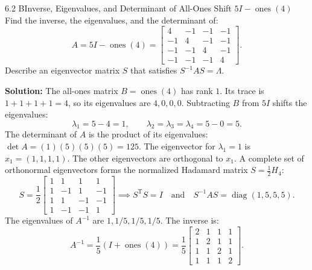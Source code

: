\documentclass[11pt,a4paper,openany,oneside]{book}
\def\vect#1{#1}%
\def\mathbf#1{#1}%
\newcommand{\vect}[1]{\mathbf{#1}}
\newcommand{\T}{\mathrm{T}}
\numberwithin{equation}{chapter}
\begin{document}
\begin{example}{6.2 B}{Inverse, Eigenvalues, and Determinant of All-Ones Shift $5I - \operatorname{ones}(4)$}
Find the inverse, the eigenvalues, and the determinant of:
\[
A = 5I - \operatorname{ones}(4) = \begin{bmatrix} 4 & -1 & -1 & -1 \\ -1 & 4 & -1 & -1 \\ -1 & -1 & 4 & -1 \\ -1 & -1 & -1 & 4 \end{bmatrix}.
\]
Describe an eigenvector matrix $S$ that satisfies $S^{-1}AS = \Lambda$.
\end{example}
\textbf{Solution:} The all-ones matrix $B = \operatorname{ones}(4)$ has rank $1$. Its trace is $1+1+1+1 = 4$, so its eigenvalues are $4, 0, 0, 0$.
Subtracting $B$ from $5I$ shifts the eigenvalues:
\[
\lambda_1 = 5 - 4 = 1, \qquad \lambda_2 = \lambda_3 = \lambda_4 = 5 - 0 = 5.
\]
The determinant of $A$ is the product of its eigenvalues: $\det A = (1)(5)(5)(5) = 125$.
The eigenvector for $\lambda_1 = 1$ is $\vect{x}_1 = (1, 1, 1, 1)$. The other eigenvectors are orthogonal to $\vect{x}_1$. A complete set of orthonormal eigenvectors forms the normalized Hadamard matrix $S = \frac{1}{2}H_4$:
\[
S = \frac{1}{2}\begin{bmatrix} 1 & 1 & 1 & 1 \\ 1 & -1 & 1 & -1 \\ 1 & 1 & -1 & -1 \\ 1 & -1 & -1 & 1 \end{bmatrix} \implies S^\T S = I \quad \text{and} \quad S^{-1}AS = \operatorname{diag}(1, 5, 5, 5).
\]
The eigenvalues of $A^{-1}$ are $1, 1/5, 1/5, 1/5$. The inverse is:
\[
A^{-1} = \frac{1}{5}\left(I + \operatorname{ones}(4)\right) = \frac{1}{5}\begin{bmatrix} 2 & 1 & 1 & 1 \\ 1 & 2 & 1 & 1 \\ 1 & 1 & 2 & 1 \\ 1 & 1 & 1 & 2 \end{bmatrix}.
\]
\end{document}

